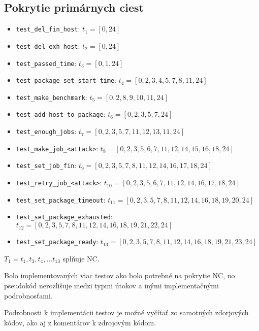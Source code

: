 \subsection*{Pokrytie primárnych ciest}
\begin{itemize}
	\item \texttt{test\_del\_fin\_host}: $t_1 = [0, 24]$
	\item \texttt{test\_del\_exh\_host}: $t_2 = [0, 24]$
	\item \texttt{test\_passed\_time}: $t_3 = [0, 1, 24]$
	\item \texttt{test\_package\_set\_start\_time}: $t_4 = [0, 2, 3, 4, 5, 7, 8, 11, 24]$
	\item \texttt{test\_make\_benchmark}: $t_5 = [0, 2, 8, 9, 10, 11, 24]$
	\item \texttt{test\_add\_host\_to\_package}: $t_6 = [0, 2, 3, 5, 7, 24]$
	\item \texttt{test\_enough\_jobs}: $t_7 = [0, 2, 3, 5, 7, 11, 12, 13, 11, 24]$
	\item \texttt{test\_make\_job\_<attack>}\footnotemark: $t_8 = [0, 2, 3, 5, 6, 7, 11, 12, 14, 15, 16, 18, 24]$
	\item \texttt{test\_set\_job\_fin}: $t_9 = [0, 2, 3, 5, 7, 8, 11, 12, 14, 16, 17, 18, 24]$
	\item \texttt{test\_retry\_job\_<attack>}\footnotemark[\value{footnote}]: $t_{10} = [0, 2, 3, 5, 6, 7, 11, 12, 14, 16, 17, 18, 24]$
	\item \texttt{test\_set\_package\_timeout}: $t_{11} = [0, 2, 3, 5, 7, 8, 11, 12, 14, 16, 18, 19, 20, 24]$
	\item \texttt{test\_set\_package\_exhausted}: $t_{12} = [0, 2, 3, 5, 7, 8, 11, 12, 14, 16, 18, 19, 21, 22, 24]$
	\item \texttt{test\_set\_package\_ready}: $t_{13} = [0, 2, 3, 5, 7, 8, 11, 12, 14, 16, 18, 19, 21, 23, 24]$
\end{itemize}
\begin{center}
	$T_1 = {t_1, t_3, t_4, \ldots t_{13}}$ splňuje NC. 
\end{center}
Bolo implementovaných viac testov ako bolo potrebné na pokrytie NC, no pseudokód nerozlišuje medzi typmi útokov a inými implementačnými podrobnosťami.

\bigskip
\noindent
Podrobnosti k implementácii testov je možné vyčítať zo samotných zdorjových kódov, ako aj z komentárov k zdrojovým kódom.

